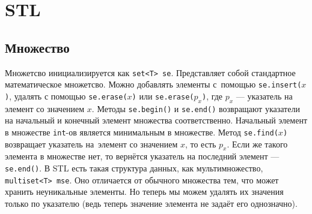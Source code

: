 \section{STL}

\subsection{Множество}

\begin{center}
\end{center}

Множетсво инициализируется как \texttt{set<T> se}. Представляет собой стандартное математическое множетсво. Можно добавлять элементы с~помощью \texttt{se.insert($x$)}, удалять с помощью \texttt{se.erase($x$)} или \texttt{se.erase($p_x$)}, где $p_x$ --- указатель на элемент со значением $x$. Методы \texttt{se.begin()} и \texttt{se.end()} возвращают указатели на начальный и конечный элемент множества соответственно. Начальный элемент в множестве \texttt{int}-ов является минимальным в множестве. Метод \texttt{se.find($x$)} возвращает указатель на~элемент со значением $x$, то есть $p_x$. Если же такого элемента в множестве нет, то вернётся указатель на последний элемент --- \texttt{se.end()}. В STL есть такая структура данных, как мультимножество, \texttt{multiset<T>~mse}. Оно отличается от обычного множества тем, что может хранить неуникальные элементы. Но теперь мы можем удалять их значения только по указателю (ведь теперь значение элемента не задаёт его однозначно).

